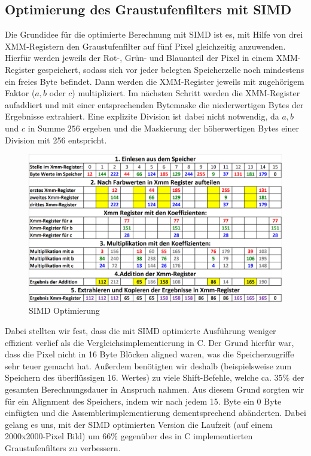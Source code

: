 \documentclass[course=erap]{aspdoc}
\begin{document}
	\subsection{Optimierung des Graustufenfilters mit SIMD}
	Die Grundidee für die optimierte Berechnung mit SIMD ist es, mit Hilfe von drei XMM-Registern den Graustufenfilter auf fünf Pixel gleichzeitig anzuwenden. Hierfür werden jeweils der Rot-, Grün- und Blauanteil der Pixel in einem XMM-Register gespeichert, sodass sich vor jeder belegten Speicherzelle noch mindestens ein freies Byte befindet. Dann werden die XMM-Register jeweils mit zugehörigem Faktor ($a,b$ oder $c$) multipliziert. Im nächsten Schritt werden die XMM-Register aufaddiert und mit einer entsprechenden Bytemaske die niederwertigen Bytes der Ergebnisse extrahiert. Eine explizite Division ist dabei nicht notwendig, da $a,b$ und $c$ in Summe $256$ ergeben und die Maskierung der höherwertigen Bytes einer Division mit 256 entspricht.
    \begin{figure}[H]
			\centering
			\includegraphics[scale=0.46]{Images/SIMDoptimization.png}
			\caption{SIMD Optimierung}
			\label{SimdOptimization}
	\end{figure}
	\noindent
	Dabei stellten wir fest, dass die mit SIMD optimierte Ausführung weniger effizient verlief als die Vergleichsimplementierung in C. Der Grund hierfür war, dass die Pixel nicht in 16 Byte Blöcken aligned waren, was die Speicherzugriffe sehr teuer gemacht hat.
	Außerdem benötigten wir deshalb (beispielsweise zum Speichern des überflüssigen 16. Wertes) zu viele Shift-Befehle, welche ca. $35\%$ der gesamten Berechnungsdauer in Anspruch nahmen. Aus diesem Grund sorgten wir für ein Alignment des Speichers, indem wir nach jedem 15. Byte ein 0 Byte einfügten und die Assemblerimplementierung dementsprechend abänderten. Dabei gelang es uns, mit der SIMD optimierten Version die Laufzeit (auf einem 2000x2000-Pixel Bild) um $66\%$ gegenüber des in C implementierten Graustufenfilters zu verbessern.
\end{document}
